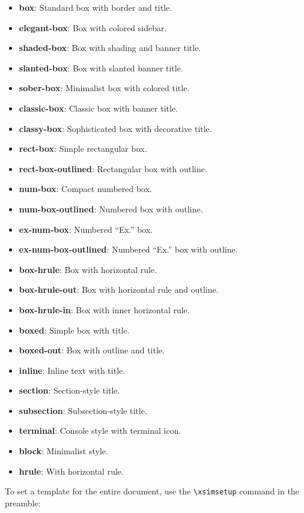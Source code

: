 \documentclass[
    margin=2cm
]{neoschool}
\begin{document}
\begin{itemize}
\item
  \textbf{box}: Standard box with border and title.
\item
  \textbf{elegant-box}: Box with colored sidebar.
\item
  \textbf{shaded-box}: Box with shading and banner title.
\item
  \textbf{slanted-box}: Box with slanted banner title.
\item
  \textbf{sober-box}: Minimalist box with colored title.
\item
  \textbf{classic-box}: Classic box with banner title.
\item
  \textbf{classy-box}: Sophisticated box with decorative title.
\item
  \textbf{rect-box}: Simple rectangular box.
\item
  \textbf{rect-box-outlined}: Rectangular box with outline.
\item
  \textbf{num-box}: Compact numbered box.
\item
  \textbf{num-box-outlined}: Numbered box with outline.
\item
  \textbf{ex-num-box}: Numbered ``Ex.'' box.
\item
  \textbf{ex-num-box-outlined}: Numbered ``Ex.'' box with outline.
\item
  \textbf{box-hrule}: Box with horizontal rule.
\item
  \textbf{box-hrule-out}: Box with horizontal rule and outline.
\item
  \textbf{box-hrule-in}: Box with inner horizontal rule.
\item
  \textbf{boxed}: Simple box with title.
\item
  \textbf{boxed-out}: Box with outline and title.
\item
  \textbf{inline}: Inline text with title.
\item
  \textbf{section}: Section-style title.
\item
  \textbf{subsection}: Subsection-style title.
\item
  \textbf{terminal}: Console style with terminal icon.
\item
  \textbf{block}: Minimalist style.
\item
  \textbf{hrule}: With horizontal rule.
\end{itemize}

To set a template for the entire document, use the
\texttt{\textbackslash xsimsetup} command in the preamble:
\end{document}
